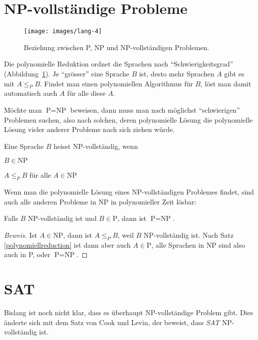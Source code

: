 \section{NP-vollständige Probleme}
\begin{figure}
\begin{center}
\texttt{[image: images/lang-4]}
\end{center}
\caption{Beziehung zwischen P, NP und NP-vollständigen Problemen.
\label{pnpnpcomplete}}
\end{figure}%
Die polynomielle Reduktion ordnet die Sprachen nach ``Schwierigkeitsgrad''
(Abbildung~\ref{pnpnpcomplete}).
Je ``grösser'' eine Sprache $B$ ist, desto mehr Sprachen $A$ gibt es
mit $A\le_P B$. Findet man einen polynomiellen Algorithmus für $B$,
löst man damit automatisch auch $A$ für alle diese $A$. 

Möchte man $\text{P} = \text{NP}$ beweisen, dann muss man nach
möglichst ``schwierigen'' Problemen suchen, also nach solchen,
deren polynomielle Lösung die polynomielle Lösung vieler anderer
Probleme nach sich ziehen würde. 

\begin{definition}
Eine Sprache $B$ heisst NP-vollständig, wenn 
\begin{compactenum}
\item $B\in\text{NP}$
\item $A\le_P B$ für alle $A\in\text{NP}$
\end{compactenum}
\end{definition}

Wenn man die polynomielle Lösung eines NP-vollständigen Problemes
findet, sind auch alle anderen Probleme in NP in polynomieller Zeit
lösbar:

\begin{satz}
Falls $B$ NP-vollständig ist und $B\in\text{P}$, dann ist
$\text{P}=\text{NP}$.
\end{satz}

\begin{proof}[Beweis]
Ist $A\in\text{NP}$, dann ist $A\le_P B$, weil $B$ NP-vollständig ist.
Nach Satz \ref{polynomiellreduction} ist dann aber auch
$A\in\text{P}$, alle Sprachen
in NP sind also auch in P, oder $\text{P}=\text{NP}$.
\end{proof}

\section{SAT}
Bislang ist noch nicht klar, dass es überhaupt NP-vollständige
Problem gibt. Dies änderte sich mit dem Satz von Cook und Levin,
der beweist, dass \textsl{SAT} NP-vollständig ist.

